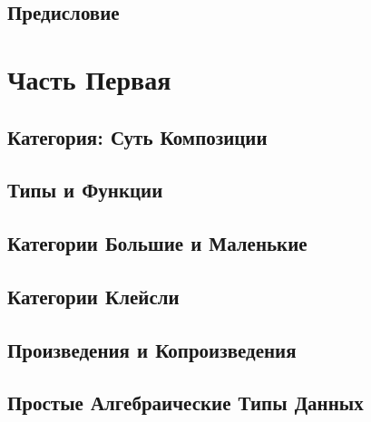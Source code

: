 
\frontmatter
\tableofcontents


\chapter*{Предисловие}
\label{Preface}


\mainmatter

\part*{Часть Первая}

\chapter{Категория: Суть Композиции}\label{category-the-essence-of-composition}


\chapter{Типы и Функции}\label{types-and-functions}


\chapter{Категории Большие и Маленькие}\label{categories-great-and-small}


\chapter{Категории Клейсли}\label{kleisli-categories}


\chapter{Произведения и Копроизведения}\label{products-and-coproducts}


\chapter{Простые Алгебраические Типы Данных}\label{simple-algebraic-data-types}



